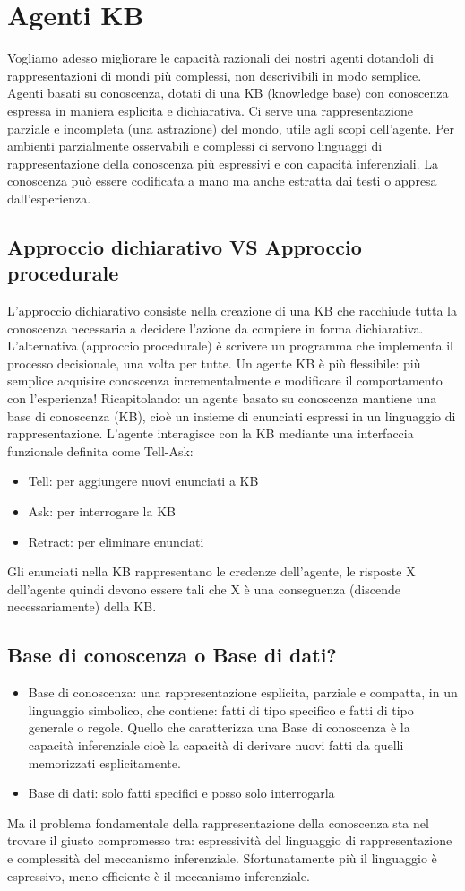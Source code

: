 \documentclass{article}
\begin{document}
\section{Agenti KB}
Vogliamo adesso migliorare le capacità razionali dei nostri agenti dotandoli di rappresentazioni di mondi più complessi, non descrivibili in modo semplice. Agenti basati su conoscenza, dotati di una KB (knowledge base) con conoscenza espressa in maniera esplicita e dichiarativa.
Ci serve una rappresentazione parziale e incompleta (una astrazione) del mondo, utile agli scopi dell’agente. Per ambienti parzialmente osservabili e complessi ci servono linguaggi di rappresentazione della conoscenza più espressivi e con capacità inferenziali. La conoscenza può essere codificata a mano ma anche estratta dai testi o appresa dall’esperienza.
\subsection{Approccio dichiarativo VS Approccio procedurale}
L'approccio dichiarativo consiste nella creazione di una KB che racchiude tutta la conoscenza necessaria a decidere l’azione da compiere in forma dichiarativa. L’alternativa (approccio procedurale) è scrivere un programma che implementa il processo decisionale, una volta per tutte.
Un agente KB è più flessibile: più semplice acquisire conoscenza incrementalmente e modificare il comportamento con l’esperienza! 
Ricapitolando: un agente basato su conoscenza mantiene una base di conoscenza (KB), cioè un insieme di enunciati espressi in un linguaggio di rappresentazione. L'agente interagisce con la KB mediante una interfaccia funzionale definita come Tell-Ask:
\begin{itemize}
    \item Tell: per aggiungere nuovi enunciati a KB
    \item Ask: per interrogare la KB
    \item Retract: per eliminare enunciati
\end{itemize}
Gli enunciati nella KB rappresentano le credenze dell’agente, le risposte X dell'agente quindi devono essere tali che X è una conseguenza (discende necessariamente) della KB. 
\subsection{Base di conoscenza o Base di dati?}
\begin{itemize}
    \item Base di conoscenza: una rappresentazione esplicita, parziale e compatta, in un linguaggio simbolico, che contiene: fatti di tipo specifico e fatti di tipo generale o regole. Quello che caratterizza una Base di conoscenza è la capacità inferenziale cioè la capacità di derivare nuovi fatti da quelli memorizzati esplicitamente. 
    \item Base di dati: solo fatti specifici e posso solo interrogarla
\end{itemize}
Ma il problema fondamentale della rappresentazione della conoscenza sta nel trovare il giusto compromesso tra: espressività del linguaggio di rappresentazione e complessità del meccanismo inferenziale. Sfortunatamente più il linguaggio è espressivo, meno  efficiente è il meccanismo inferenziale. 
\end{document}
